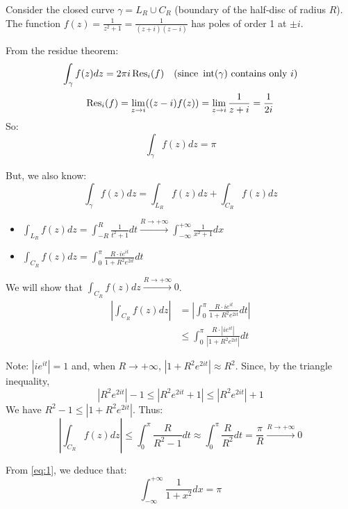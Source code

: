 \begin{example}
    
Consider the closed curve $\gamma = L_R \cup C_R$ (boundary of the half-disc of radius $R$). The function $f(z) = \frac{1}{z^2+1} = \frac{1}{(z+i)(z-i)}$ has poles of order 1 at $\pm i$. 

From the residue theorem:
\[ \int_\gamma f(z) dz = 2\pi i \operatorname{Res}_i(f) \quad (\text{since } \operatorname{int}(\gamma) \text{ contains only } i) \]
\[ \operatorname{Res}_i(f) = \lim_{z \to i} ((z-i)f(z)) = \lim_{z \to i} \frac{1}{z+i} = \frac{1}{2i} \]
So:
\begin{equation}
    \int_\gamma f(z) dz = \pi \label{eq:1}
\end{equation}

But, we also know:
\[ \int_\gamma f(z) dz = \int_{L_R} f(z) dz + \int_{C_R} f(z) dz \]
\begin{itemize}
    \item $\int_{L_R} f(z) dz = \int_{-R}^{R} \frac{1}{t^2+1} dt \xrightarrow{R \to +\infty} \int_{-\infty}^{+\infty} \frac{1}{x^2+1} dx$
    \item $\int_{C_R} f(z) dz = \int_{0}^{\pi} \frac{R \cdot i e^{it}}{1 + R^2 e^{2it}} dt$
\end{itemize}

We will show that $\int_{C_R} f(z) dz \xrightarrow{R \to +\infty} 0$.
\begin{align*}
    \left| \int_{C_R} f(z) dz \right| &= \left| \int_{0}^{\pi} \frac{R \cdot i e^{it}}{1 + R^2 e^{2it}} dt \right| \\
    &\le \int_{0}^{\pi} \frac{R \cdot |i e^{it}|}{|1 + R^2 e^{2it}|} dt
\end{align*}

Note: $|i e^{it}| = 1$ and, when $R \to +\infty$, $|1 + R^2 e^{2it}| \approx R^2$. 
Since, by the triangle inequality,
\[ |R^2 e^{2it}| - 1 \le |R^2 e^{2it} + 1| \le |R^2 e^{2it}| + 1 \]
We have $R^2 - 1 \le |1 + R^2 e^{2it}|$. Thus:
\[ \left| \int_{C_R} f(z) dz \right| \le \int_{0}^{\pi} \frac{R}{R^2 - 1} dt \approx \int_{0}^{\pi} \frac{R}{R^2} dt = \frac{\pi}{R} \xrightarrow{R \to +\infty} 0 \]

From \eqref{eq:1}, we deduce that:
\[ \int_{-\infty}^{+\infty} \frac{1}{1+x^2} dx = \pi \]
\end{example}
